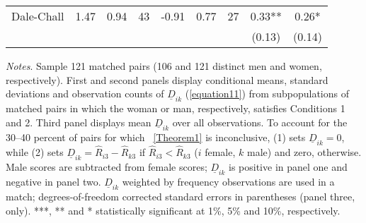 \begin{table}
\begin{threeparttable}
\begin{tabular}{p{3cm}S[table-format=3.3]@{}S[table-format=3.3]@{}S[table-format=3.2]@{}S[table-format=4.3]@{}S[table-format=3.3]@{}S[table-format=3.1]@{}S@{}S@{}}
            Dale-Chall                    &        1.47&        0.94&          43&       -0.91&        0.77&          27&        0.33** &        0.26*  \\
                                          &            &            &            &            &            &            &      (0.13)   &      (0.14)   \\
            \bottomrule
        \end{tabular}
        \begin{tablenotes}
            \tiny
            \item \textit{Notes}. Sample 121 matched pairs (106 and 121 distinct men and women, respectively). First and second panels display conditional means, standard deviations and observation counts of \(\underline D_{ik}\) (\autoref{equation11}) from subpopulations of matched pairs in which the woman or man, respectively, satisfies Conditions 1 and 2. Third panel displays mean \(\underline D_{ik}\) over all observations. To account for the 30--40 percent of pairs for which ~\autoref{Theorem1} is inconclusive, (1) sets \(\underline D_{ik}=0\), while (2) sets \(\underline D_{ik}=\widehat R_{i3}-\widehat R_{k3}\) if \(\widehat R_{i3}<\widehat R_{k3}\) (\(i\) female, \(k\) male) and zero, otherwise. Male scores are subtracted from female scores; \(\underline D_{ik}\) is positive in panel one and negative in panel two. \(\underline D_{ik}\) weighted by frequency observations are used in a match; degrees-of-freedom corrected standard errors in parentheses (panel three, only). ***, ** and * statistically significant at 1\%, 5\% and 10\%, respectively.
        \end{tablenotes}
    \end{threeparttable}
\end{table}